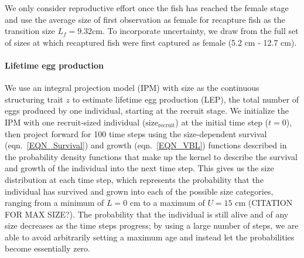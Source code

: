 \documentclass[12pt, oneside]{article}   	%
\begin{document}
We only consider reproductive effort once the fish has reached the female stage and use the average size of first observation as female for recapture fish as the transition size $L_f = 9.32 \text{cm}$. To incorporate uncertainty, we draw from the full set of sizes at which recaptured fish were first captured as female (5.2 cm - 12.7 cm).



\paragraph*{Lifetime egg production}
We use an integral projection model (IPM) \citep[e.g.][]{rees2014building} with size as the continuous structuring trait $z$ to estimate lifetime egg production (LEP), the total number of eggs produced by one individual, starting at the recruit stage. We initialize the IPM with one recruit-sized individual ($\text{size}_\text{recruit}$) at the initial time step ($t=0$), then project forward for 100 time steps using the size-dependent survival (eqn.\ \ref{EQN_Survival}) and growth (eqn.\ \ref{EQN_VBL}) functions described in the probability density functions that make up the kernel to describe the survival and growth of the individual into the next time step. This gives us the size distribution at each time step, which represents the probability that the individual has survived and grown into each of the possible size categories, ranging from a minimum of $L=0$ cm to a maximum of $U=15$ cm (CITATION FOR MAX SIZE?). The probability that the individual is still alive and of any size decreases as the time steps progress; by using a large number of steps, we are able to avoid arbitrarily setting a maximum age and instead let the probabilities become essentially zero. 
\end{document}
